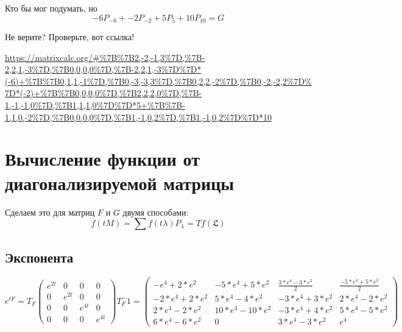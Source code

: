 \documentclass[12pt, a4paper]{article}
\begin{document}
    Кто бы мог подумать, но 
    \begin{equation}
        -6 P_{-6} + -2 P_{-2} + 5 P_{5} + 10 P_{10} = G
    \end{equation}


    Не верите? Проверьте, вот ссылка!

    \url{https://matrixcalc.org/#%7B%7B2,-2,-1,3%7D,%7B-2,2,1,-3%7D,%7B0,0,0,0%7D,%7B-2,2,1,-3%7D%7D*(-6)+%7B%7B0,1,1,-1%7D,%7B0,-3,-3,3%7D,%7B0,2,2,-2%7D,%7B0,-2,-2,2%7D%7D*(-2)+%7B%7B0,0,0,0%7D,%7B2,2,2,0%7D,%7B-1,-1,-1,0%7D,%7B1,1,1,0%7D%7D*5+%7B%7B-1,1,0,-2%7D,%7B0,0,0,0%7D,%7B1,-1,0,2%7D,%7B1,-1,0,2%7D%7D*10}

    



    \section{Вычисление функции от диагонализируемой матрицы}

    Сделаем это для матриц $F$ и $G$ двумя способами:
    \begin{equation}
        f(t M) = \sum {f(t\lambda) P_\lambda} = T f(\mathfrak{L})
    \end{equation}

    \subsection{Экспонента}

    \begin{equation}
        e^{t F} = T_F \left(\begin{matrix}
            e^{2t} & 0 & 0 & 0 \\
            0 & e^{2t} & 0 & 0 \\
            0 & 0 & e^{4t} & 0 \\
            0 & 0 & 0 & e^{4t}
        \end{matrix}\right) T_F^-1 = 
        \left(\begin{matrix}
            -e^4+2*e^2 & -5*e^4+5*e^2 & \frac{3*e^4-3*e^2}{2} & \frac{-5*e^4+5*e^2}{2} \\
            -2*e^4+2*e^2 & 5*e^4-4*e^2 & -3*e^4+3*e^2 & 2*e^4-2*e^2 \\
            2*e^4-2*e^2 & 10*e^4-10*e^2 & -3*e^4+4*e^2 & 5*e^4-5*e^2 \\
            6*e^4-6*e^2 & 0 & 3*e^4-3*e^2 & e^4
        \end{matrix}\right)
    \end{equation}
\end{document}
